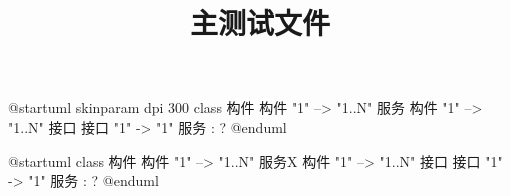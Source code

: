 \documentclass{ctexart}
\title{主测试文件}
\begin{document}
\lipsum[1]


\begin{plantuml}[width=0.4\textwidth]
@startuml
skinparam dpi 300
class 构件
构件 "1" --> "1..N" 服务
构件 "1" --> "1..N" 接口
接口 "1" -> "1" 服务 : ?
@enduml
\end{plantuml}

\lipsum[2]

\begin{plantuml}
@startuml
class 构件
构件 "1" --> "1..N" 服务X
构件 "1" --> "1..N" 接口
接口 "1" -> "1" 服务 : ?
@enduml
\end{plantuml}

\lipsum[3]
\end{document}

